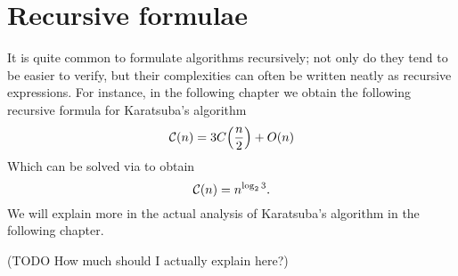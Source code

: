 \section{Recursive formulae}%
\label{sec:Recursive forumulae}

It is quite common to formulate algorithms recursively; not only do they tend to be easier to verify, but their complexities can often be written neatly as recursive expressions. For instance, in the following chapter we obtain the following recursive formula for Karatsuba's algorithm
\[
    \M{C}(n) = 3C\bb{\frac{n}{2}} + O(n)
\]
Which can be solved via to obtain
\[
    \mathcal C(n) =  n^{\log_2 3}.
\]
We will explain more in the actual analysis of Karatsuba's algorithm in the following chapter.

(TODO How much should I actually explain here?)
